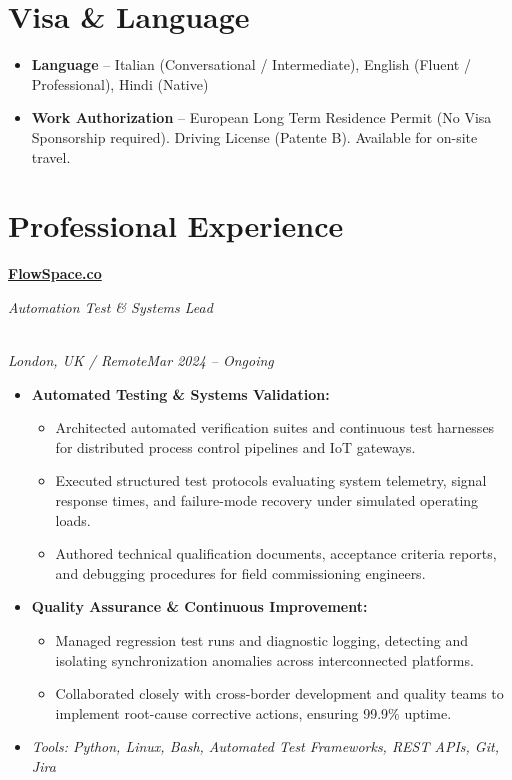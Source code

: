 \documentclass[a4paper,10pt]{article}
\newcommand{\role}[4]{\vspace{3pt}\noindent\hspace{0.6em}\parbox[t]{0.38\textwidth}{\raggedright\textbf{#1}}\hfill\parbox[t]{0.58\textwidth}{\raggedleft\textit{#2}}\\{\textit{#3}\hfill\textit{#4}}\vspace{1pt}}
\begin{document}
\section{Visa \& Language}
\begin{itemize}
\item \textbf{Language} -- Italian (Conversational / Intermediate), English (Fluent / Professional), Hindi (Native)
\item \textbf{Work Authorization} -- European Long Term Residence Permit (No Visa Sponsorship required). Driving License (Patente B). Available for on-site travel.
\end{itemize}

\section{Professional Experience}
\role{\href{https://flowspace.co}{FlowSpace.co}}{Automation Test \& Systems Lead}{London, UK / Remote}{Mar 2024 -- Ongoing}
\begin{itemize}
\item \textbf{Automated Testing \& Systems Validation:}
\begin{itemize}[label=--]
\item Architected automated verification suites and continuous test harnesses for distributed process control pipelines and IoT gateways.
\item Executed structured test protocols evaluating system telemetry, signal response times, and failure-mode recovery under simulated operating loads.
\item Authored technical qualification documents, acceptance criteria reports, and debugging procedures for field commissioning engineers.
\end{itemize}
\item \textbf{Quality Assurance \& Continuous Improvement:}
\begin{itemize}[label=--]
\item Managed regression test runs and diagnostic logging, detecting and isolating synchronization anomalies across interconnected platforms.
\item Collaborated closely with cross-border development and quality teams to implement root-cause corrective actions, ensuring 99.9\% uptime.
\end{itemize}
\item \textit{Tools: Python, Linux, Bash, Automated Test Frameworks, REST APIs, Git, Jira}
\end{itemize}
\end{document}
